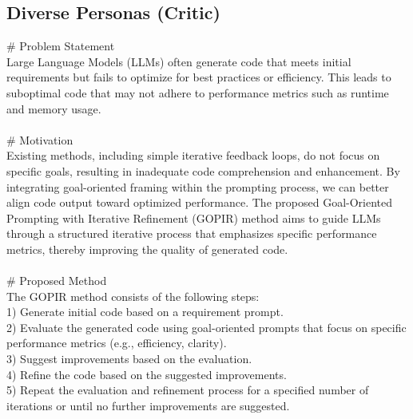 \subsection{Diverse Personas (Critic)}
{\centering
\begin{tcolorbox}[
    colframe=green!50!black, 
    colback=green!10!white, 
    title=Goal-Oriented Prompting with Iterative Refinement for Enhanced Code Generation in Large Language Models, 
    width=0.95\textwidth,
    boxsep=3pt
]
\# Problem Statement \\
Large Language Models (LLMs) often generate code that meets initial requirements but fails to optimize for best practices or efficiency. This leads to suboptimal code that may not adhere to performance metrics such as runtime and memory usage.
\\
\\
\# Motivation \\
Existing methods, including simple iterative feedback loops, do not focus on specific goals, resulting in inadequate code comprehension and enhancement. By integrating goal-oriented framing within the prompting process, we can better align code output toward optimized performance. The proposed Goal-Oriented Prompting with Iterative Refinement (GOPIR) method aims to guide LLMs through a structured iterative process that emphasizes specific performance metrics, thereby improving the quality of generated code.
\\
\\
\# Proposed Method \\
The GOPIR method consists of the following steps: \\
1) Generate initial code based on a requirement prompt. \\
2) Evaluate the generated code using goal-oriented prompts that focus on specific performance metrics (e.g., efficiency, clarity). \\
3) Suggest improvements based on the evaluation. \\
4) Refine the code based on the suggested improvements. \\
5) Repeat the evaluation and refinement process for a specified number of iterations or until no further improvements are suggested.
\end{tcolorbox}
\par}
\clearpage

